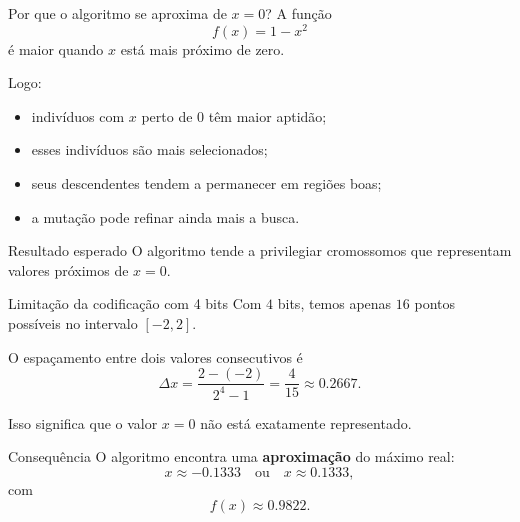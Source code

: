 \documentclass[mathserif, 10pt]{beamer}
\begin{document}
\begin{frame}{Por que o algoritmo se aproxima de \(x=0\)?}
	A função
	\[
	f(x)=1-x^2
	\]
	é maior quando \(x\) está mais próximo de zero.
	
	\pause
	
	Logo:
	\begin{itemize}
		\item indivíduos com \(x\) perto de \(0\) têm maior aptidão;
		\item esses indivíduos são mais selecionados;
		\item seus descendentes tendem a permanecer em regiões boas;
		\item a mutação pode refinar ainda mais a busca.
	\end{itemize}
	
	\pause
	
	\begin{block}{Resultado esperado}
		O algoritmo tende a privilegiar cromossomos que representam valores próximos de \(x=0\).
	\end{block}
\end{frame}

\begin{frame}{Limitação da codificação com 4 bits}
	Com \(4\) bits, temos apenas \(16\) pontos possíveis no intervalo \([-2,2]\).
	
	\pause
	
	O espaçamento entre dois valores consecutivos é
	\[
	\Delta x=\frac{2-(-2)}{2^4-1}=\frac{4}{15}\approx 0.2667.
	\]
	
	\pause
	
	Isso significa que o valor \(x=0\) não está exatamente representado.
	
	\pause
	
	\begin{alertblock}{Consequência}
		O algoritmo encontra uma \textbf{aproximação} do máximo real:
		\[
		x\approx -0.1333
		\quad \text{ou} \quad
		x\approx 0.1333,
		\]
		com
		\[
		f(x)\approx 0.9822.
		\]
	\end{alertblock}
\end{frame}
\end{document}
